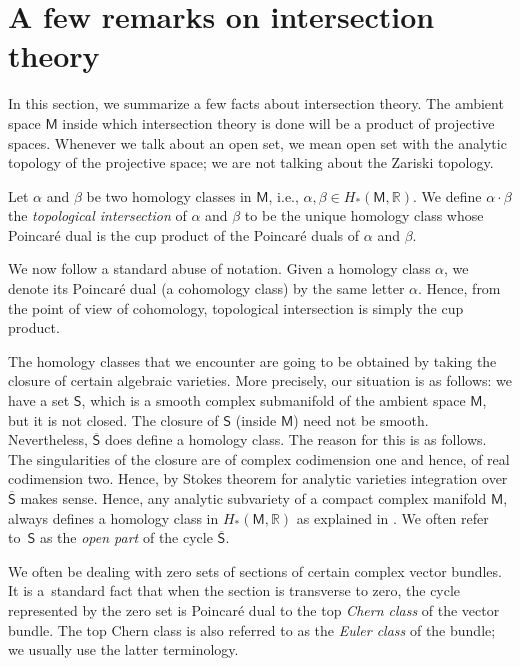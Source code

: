 \section{A few remarks on intersection theory}

In this section, we summarize a few facts about intersection theory.
The ambient space $\mathsf{M}$
inside which intersection theory is done will be a product
of projective spaces. Whenever we talk about an open set,
we mean open set with the analytic topology of the projective space;
we are not talking about the Zariski topology.

Let $\alpha$ and $\beta$ be two homology classes
in $\mathsf{M}$, i.e., $\alpha, \beta \in H_*(\mathsf{M}, \mathbb{R})$.
We define $\alpha\cdot \beta$ the \emph{topological intersection} of
$\alpha$ and $\beta$ to be the unique homology class whose Poincar\'{e} dual is the
cup product of the Poincar\'{e} duals of $\alpha$ and $\beta$.

We now follow a standard abuse of notation.
Given a homology class $\alpha$, we denote its Poincar\'{e} dual (a cohomology class)
by the same letter $\alpha$.
Hence, from the point of view of cohomology,
topological intersection is simply the cup product.

The homology classes that we encounter are going to be obtained
by taking the closure of certain algebraic varieties. More precisely,
our situation is as follows: we have a set $\mathsf{S}$, which is
a smooth complex submanifold of the ambient space $\mathsf{M}$, but it is
not closed. The closure of $\mathsf{S}$ (inside $\mathsf{M}$)
need not be smooth. Nevertheless, $\overline{\mathsf{S}}$ does define a homology class.
The reason for this is as follows. The singularities of the closure are of
complex codimension one and hence, of real codimension two. Hence, by Stokes theorem
for analytic varieties
\cite[p.~33]{GH3}
integration over $\overline{\mathsf{S}}$ makes sense.
Hence, any analytic subvariety of a compact complex manifold $\mathsf{M}$, always
defines a homology class in $H_*(\mathsf{M}, \mathbb{R})$ as explained in
\cite[pp.~33 and 61]{GH3}. We often refer to~$\mathsf{S}$ as the
\emph{open part} of the cycle $\overline{\mathsf{S}}$.

We often be dealing with zero sets of sections of certain complex vector bundles.
It is a~standard fact that when the section is transverse to zero, the cycle represented
by the zero set is Poincar\'{e} dual to the top \emph{Chern class} of the vector bundle.
The top Chern class is also referred to as the \emph{Euler class} of the bundle; we
usually use the latter terminology.

